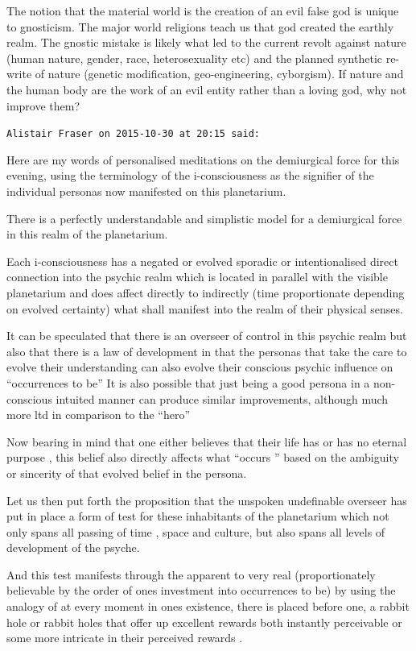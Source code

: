 \begin{footnotesize}
\begin{sffamily}
The notion that the material world is the creation of an evil false god is unique to gnosticism. The major world religions teach us that god created the earthly realm. The gnostic mistake is likely what led to the current revolt against nature (human nature, gender, race, heterosexuality etc) and the planned synthetic re-write of nature (genetic modification, geo-engineering, cyborgism). If nature and the human body are the work of an evil entity rather than a loving god, why not improve them?

\hfill

\texttt{Alistair Fraser on 2015-10-30 at 20:15 said:}

Here are my words of personalised meditations on the demiurgical force for this evening, using the terminology of the i-consciousness as the signifier of the individual personas now manifested on this planetarium.

There is a perfectly understandable and simplistic model for a demiurgical force in this realm of the planetarium.

Each i-consciousness has a negated or evolved sporadic or intentionalised direct connection into the psychic realm which is located in parallel with the visible planetarium and does affect directly to indirectly (time proportionate depending on evolved certainty) what shall manifest into the realm of their physical senses.

It can be speculated that there is an overseer of control in this psychic realm but also that there is a law of development in that the personas that take the care to evolve their understanding can also evolve their conscious psychic influence on ``occurrences to be'' It is also possible that just being a good persona in a non-conscious intuited manner can produce similar improvements, although much more ltd in comparison to the ``hero''

Now bearing in mind that one either believes that their life has or has no eternal purpose , this belief also directly affects what ``occurs '' based on the ambiguity or sincerity of that evolved belief in the persona.

Let us then put forth the proposition that the unspoken undefinable overseer has put in place a form of test for these inhabitants of the planetarium which not only spans all passing of time , space and culture, but also spans all levels of development of the psyche.

And this test manifests through the apparent to very real (proportionately believable by the order of ones investment into occurrences to be) by using the analogy of at every moment in ones existence, there is placed before one, a rabbit hole or rabbit holes that offer up excellent rewards both instantly perceivable or some more intricate in their perceived rewards .


\end{sffamily}
\end{footnotesize}
